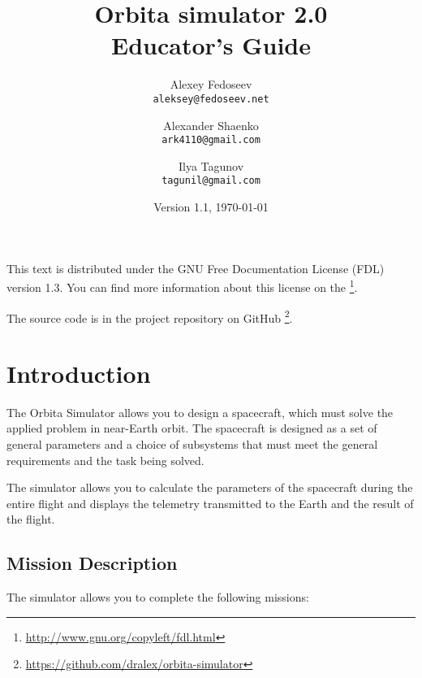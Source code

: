\documentclass[12pt,a4paper]{article}
\begin{document}
\title{%
  \textbf{Orbita simulator 2.0} \\
     Educator's Guide}

\author{
  Alexey Fedoseev\\
  \texttt{aleksey@fedoseev.net}
  \and
  Alexander Shaenko\\
  \texttt{ark4110@gmail.com}
  \and
  Ilya Tagunov\\
  \texttt{tagunil@gmail.com}
}

\date{Version 1.1, \today}

\maketitle

This text is distributed under the GNU Free Documentation License (FDL) version
1.3. You can find more information about this license on the
\footnote{\url{http://www.gnu.org/copyleft/fdl.html}}.

The source code is in the project repository on GitHub
\footnote{\url{https://github.com/dralex/orbita-simulator}}.

\tableofcontents

\clearpage
\section{Introduction}

The Orbita Simulator allows you to design a spacecraft, which must solve the applied problem in near-Earth orbit. The spacecraft is designed as a set of general parameters and a choice of subsystems that must meet the general requirements and the task being solved.

The simulator allows you to calculate the parameters of the spacecraft during the entire flight and displays the telemetry transmitted to the Earth and the result of the flight.

\subsection{Mission Description}

The simulator allows you to complete the following missions:
\end{document}
